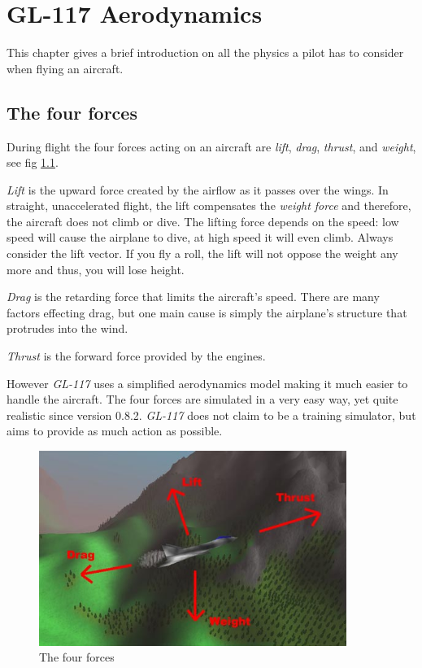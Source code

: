 \chapter{GL-117 Aerodynamics}
\label{chap:aerodynamics}

This chapter gives a brief introduction on all the physics
a pilot has to consider when flying an aircraft.

\section{The four forces}
\label{sec:forces}

During flight the four forces acting on an aircraft are \textit{lift},
\textit{drag}, \textit{thrust}, and \textit{weight}, see fig \ref{fig:forces}.

\textit{Lift} is the upward force created by the airflow as it
passes over the wings.
In straight, unaccelerated flight, the lift compensates the
\textit{weight force} and therefore, the aircraft does not climb or dive.
The lifting force depends on the speed: low speed will cause the
airplane to dive, at high speed it will even climb.
Always consider the lift vector. If you fly a roll, the lift will not
oppose the weight any more and thus, you will lose height.

\textit{Drag} is the retarding force that limits the aircraft's speed.
There are many factors effecting drag, but one main cause
is simply the airplane's structure that protrudes into the wind.

\textit{Thrust} is the forward force provided by the engines.

However \emph{GL-117} uses a simplified aerodynamics model making
it much easier to handle the aircraft. The four forces are
simulated in a very easy way, yet quite realistic since version 0.8.2.
\emph{GL-117} does not claim to be a training simulator, but aims to provide
as much action as possible.

\begin{figure}
\begin{center}
\includegraphics[width=10cm]{forces.jpg}
\caption{The four forces}
\label{fig:forces}
\end{center}
\end{figure}



